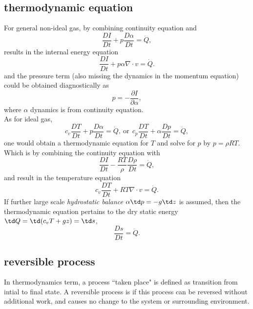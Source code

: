 \subsection{thermodynamic equation}
For general {\clr non-ideal gas}, by combining continuity equation and
\begin{equation}
    \frac{DI}{Dt} + p \frac{D\alpha}{Dt} = \dot{Q}, 
\end{equation}
results in the internal energy equation
\begin{equation}
    \boxed{\frac{DI}{Dt} + p\alpha \nabla \cdot v = \dot{Q}}.
\end{equation}
and the pressure term (also missing the dynamics in the momentum equation) could be obtained
diagnostically as
\begin{equation}
   p = -\frac{\partial I}{\partial \alpha},
\end{equation}
where $\alpha$ dynamics is from continuity equation. \\

As for {\clr ideal gas}, 
\begin{equation}
    c_v\frac{DT}{Dt} + p \frac{D\alpha}{Dt} = \dot{Q}, \ \text{or} \ \ 
    c_p\frac{DT}{Dt} + \alpha \frac{Dp}{Dt} = \dot{Q},
\end{equation}
one would obtain a thermodynamic equation for $T$ and solve for $p$ by $p = \rho R T$. Which is
by combining the continuity equation with
\begin{equation}
    \frac{DI}{Dt} - \frac{RT}{\rho} \frac{D\rho}{Dt} = \dot{Q},
\end{equation}
and result in the temperature equation
\begin{equation}
    \boxed{c_v\frac{DT}{Dt} + RT \nabla \cdot v = \dot{Q}}.
\end{equation}
If further large scale \emph{\clr hydrostatic balance} $\alpha \td p = -g \td z$ is assumed, then the
thermodynamic equation pertains to the dry static energy $\td Q = \td (c_v T + gz) = \td s$, 
\begin{equation}
   \boxed{\frac{Ds}{Dt} = \dot{Q}}.
\end{equation}

\subsection{reversible process}
In thermodynamics term, a process ``taken place" is defined as transition from intial to final
state. A reversible process is if this process can be reversed without additional work, and causes
no change to the system or surrounding environment. 

